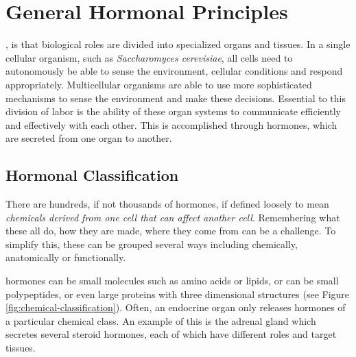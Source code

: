 \documentclass{tufte-handout}
\begin{document}
\section{General Hormonal Principles}
, is that biological roles are divided into specialized organs and tissues.  In a single cellular organism, such as \textit{Saccharomyces cerevisiae}, all cells need to autonomously be able to sense the environment, cellular conditions and respond appropriately.  Multicellular organisms are able to use more sophisticated mechanisms to sense the environment and make these decisions.  Essential to this division of labor is the ability of these organ systems to communicate efficiently and effectively with each other.  This is accomplished through hormones, which are secreted from one organ to another.

\subsection{Hormonal Classification}

There are hundreds, if not thousands of hormones, if defined loosely to mean \emph{chemicals derived from one cell that can affect another cell}.  Remembering what these all do, how they are made, where they come from can be a challenge.  To simplify this, these can be grouped several ways including chemically, anatomically or functionally.  

 hormones can be small molecules such as amino acids or lipids, or can be small polypeptides, or even large proteins with three dimensional structures (see Figure \ref{fig:chemical-classification}).  Often, an endocrine organ only releases hormones of a particular chemical class.  An example of this is the adrenal gland which secretes several steroid hormones, each of which have different roles and target tissues.
\end{document}
